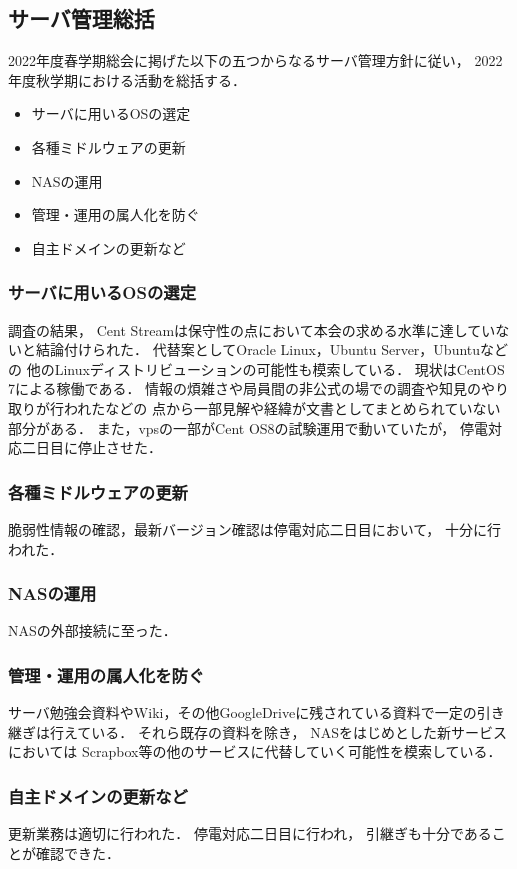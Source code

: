 \subsection*{サーバ管理総括}


2022年度春学期総会に掲げた以下の五つからなるサーバ管理方針に従い，
2022年度秋学期における活動を総括する．
\begin{itemize}
    \item サーバに用いるOSの選定
    \item 各種ミドルウェアの更新
    \item NASの運用
    \item 管理・運用の属人化を防ぐ
    \item 自主ドメインの更新など
\end{itemize}

\subsubsection*{サーバに用いるOSの選定}
調査の結果，
Cent Streamは保守性の点において本会の求める水準に達していないと結論付けられた．
代替案としてOracle Linux，Ubuntu Server，Ubuntuなどの
他のLinuxディストリビューションの可能性も模索している．
現状はCentOS 7による稼働である．
情報の煩雑さや局員間の非公式の場での調査や知見のやり取りが行われたなどの
点から一部見解や経緯が文書としてまとめられていない部分がある．
また，vpsの一部がCent OS8の試験運用で動いていたが，
停電対応二日目に停止させた．

\subsubsection*{各種ミドルウェアの更新}
脆弱性情報の確認，最新バージョン確認は停電対応二日目において，
十分に行われた．

\subsubsection*{NASの運用}
NASの外部接続に至った．

\subsubsection*{管理・運用の属人化を防ぐ}
サーバ勉強会資料やWiki，その他GoogleDriveに残されている資料で一定の引き継ぎは行えている．
それら既存の資料を除き，
NASをはじめとした新サービスにおいては
Scrapbox等の他のサービスに代替していく可能性を模索している．

\subsubsection*{自主ドメインの更新など}
更新業務は適切に行われた．
停電対応二日目に行われ，
引継ぎも十分であることが確認できた．
